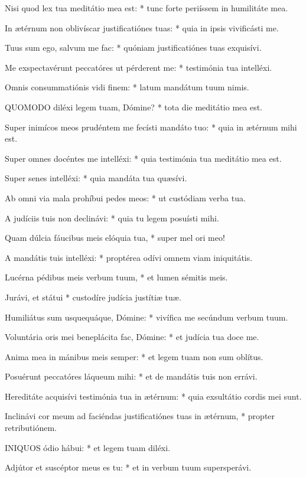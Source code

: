 Nisi quod lex tua meditátio mea est: * tunc forte periíssem in humilitáte mea.

In ætérnum non oblivíscar justificatiónes tuas: * quia in ipsis vivificásti me.

Tuus sum ego, salvum me fac: * quóniam justificatiónes tuas exquisívi.

Me exspectavérunt peccatóres ut pérderent me: * testimónia tua intelléxi.

Omnis consummatiónis vidi finem: * latum mandátum tuum nimis.


\lettrine[lines=2]{Q}{UOMODO} diléxi legem tuam, Dómine? * tota die meditátio mea est.

Super inimícos meos prudéntem me fecísti mandáto tuo: * quia in ætérnum mihi est.

Super omnes docéntes me intelléxi: * quia testimónia tua meditátio mea est.

Super senes intelléxi: * quia mandáta tua quæsívi.

Ab omni via mala prohíbui pedes meos: * ut custódiam verba tua.

A judíciis tuis non declinávi: * quia tu legem posuísti mihi.

Quam dúlcia fáucibus meis elóquia tua, * super mel ori meo!

A mandátis tuis intelléxi: * proptérea odívi omnem viam iniquitátis.

Lucérna pédibus meis verbum tuum, * et lumen sémitis meis.

Jurávi, et státui * custodíre judícia justítiæ tuæ.

Humiliátus sum usquequáque, Dómine: * vivífica me secúndum verbum tuum.

Voluntária oris mei beneplácita fac, Dómine: * et judícia tua doce me.

Anima mea in mánibus meis semper: * et legem tuam non sum oblítus.

Posuérunt peccatóres láqueum mihi: * et de mandátis tuis non errávi.

Hereditáte acquisívi testimónia tua in ætérnum: * quia exsultátio cordis mei sunt.

Inclinávi cor meum ad faciéndas justificatiónes tuas in ætérnum, * propter retributiónem.


\lettrine[lines=2]{I}{NIQUOS} ódio hábui: * et legem tuam diléxi.

Adjútor et suscéptor meus es tu: * et in verbum tuum supersperávi.

